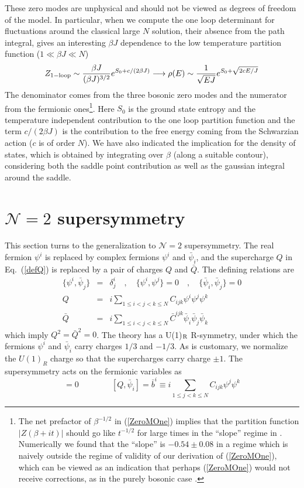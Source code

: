 \documentclass[aps,pre,preprint,onecolumn,citeautoscript,superscriptaddress,nofootinbib,eqsecnum]{revtex4-1}
\def\bea{\begin{eqnarray}}
\def\eea{\end{eqnarray}}
\newcommand{\nn}{\nonumber \\}
\def\nref#1{(\ref{#1})}
\def\be{\begin{equation}}
\def\ee{\end{equation}}
\begin{document}
These zero modes are unphysical and should not be viewed as degrees of freedom of the model. In particular, when we 
compute the one loop determinant for fluctuations around the classical large $N$ solution, their absence from the path integral, gives 
an interesting $\beta J$ dependence to the low temperature partition function ($ 1\ll \beta J \ll N $) 
\be  \label{ZeroMOne}
 Z_{\rm 1-loop} \sim { \beta J \over (\beta J )^{3/2} } e^{ S_0 + c/(2 \beta J) }  \longrightarrow \rho(E) \sim { 1 \over \sqrt{ E J } } e^{ S_0 + \sqrt{ 2 c E/J}}
\ee
The denominator comes from the three bosonic zero modes and the numerator from the fermionic 
ones\footnote{The net prefactor of $\beta^{-1/2}$ in \nref{ZeroMOne} implies that the partition function 
$|Z(\beta + i  t)|$ should go like $ t^{-1/2}$ for large times in the ``slope'' regime in \cite{StanfordGroup}. 
Numerically we found that the ``slope'' is $-0.54\pm 0.08$ in a regime which is naively outside the 
regime of validity of our derivation of \nref{ZeroMOne}, which can be viewed as an indication that
perhaps \nref{ZeroMOne} would not receive corrections, as in the purely bosonic case \cite{StanfordGroup}. }. Here $S_0$ is the ground state entropy and the
temperature independent contribution to the one loop partition function and the term $c/(2 \beta J)$ is the contribution to the free energy coming from the 
Schwarzian action ($c$ is of order $N$).
 We have also indicated the implication for the density of states, which is obtained by integrating over $\beta$ (along a suitable contour), considering
both the saddle point contribution as well as the gaussian integral around the saddle. 



\section{$\mathcal{N}=2$ supersymmetry}
\label{sec:N2}

This section turns to the generalization to $\mathcal{N}=2$ supersymmetry. The real fermion $\psi^i$ is replaced by
complex fermions $\psi^i$ and $\bar \psi_i$, and the
supercharge $Q$ in Eq.~(\ref{defQ}) is replaced by a pair of charges $Q$ and $\bar Q$. The defining relations are
\bea
\{\psi^i , \bar \psi_j\} &=& \delta^i_j \quad, \quad \{\psi^i ,  \psi^j \} = 0 \quad, \quad \{\bar \psi_i ,  \bar \psi_j \} = 0 \nn
Q &=& i \sum_{1\leq i < j< k\leq N} C_{ijk} \psi^i \psi^j \psi^k \nn
\bar Q &=& i \sum_{1\leq i < j< k\leq N} \bar C^{ijk} \bar \psi_i \bar \psi_j \bar \psi_k
\eea
which imply $Q^2 = \bar Q^2 = 0$.
The theory has a U(1)$_{\rm R}$ R-symmetry, under which the fermions
$\psi^i$ and $\bar \psi_i$ carry charges $1/3$ and $-1/3$. As is customary, we normalize the $U(1)_R$ charge so that the supercharges carry charge $\pm 1$. 
The supersymmetry acts on the fermionic variables as 
\begin{equation}
[Q, \psi^i ] =0 \qquad \qquad [Q, \bar \psi_i] =  \bar b^i \equiv i \sum_{1\leq j < k\leq N} C_{ijk} \psi^j \psi^k
\end{equation}
\end{document}
